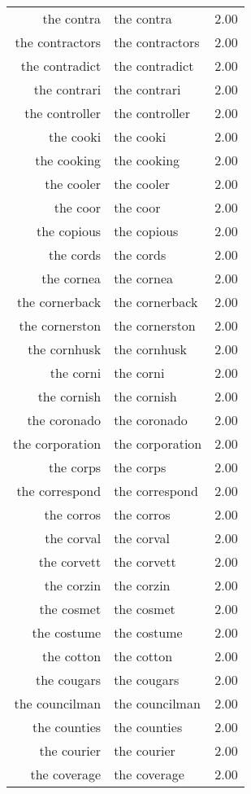 \begin{table}[ht]
\begin{tabular}{rlr}
  the contra & the contra & 2.00 \\ 
  the contractors & the contractors & 2.00 \\ 
  the contradict & the contradict & 2.00 \\ 
  the contrari & the contrari & 2.00 \\ 
  the controller & the controller & 2.00 \\ 
  the cooki & the cooki & 2.00 \\ 
  the cooking & the cooking & 2.00 \\ 
  the cooler & the cooler & 2.00 \\ 
  the coor & the coor & 2.00 \\ 
  the copious & the copious & 2.00 \\ 
  the cords & the cords & 2.00 \\ 
  the cornea & the cornea & 2.00 \\ 
  the cornerback & the cornerback & 2.00 \\ 
  the cornerston & the cornerston & 2.00 \\ 
  the cornhusk & the cornhusk & 2.00 \\ 
  the corni & the corni & 2.00 \\ 
  the cornish & the cornish & 2.00 \\ 
  the coronado & the coronado & 2.00 \\ 
  the corporation & the corporation & 2.00 \\ 
  the corps & the corps & 2.00 \\ 
  the correspond & the correspond & 2.00 \\ 
  the corros & the corros & 2.00 \\ 
  the corval & the corval & 2.00 \\ 
  the corvett & the corvett & 2.00 \\ 
  the corzin & the corzin & 2.00 \\ 
  the cosmet & the cosmet & 2.00 \\ 
  the costume & the costume & 2.00 \\ 
  the cotton & the cotton & 2.00 \\ 
  the cougars & the cougars & 2.00 \\ 
  the councilman & the councilman & 2.00 \\ 
  the counties & the counties & 2.00 \\ 
  the courier & the courier & 2.00 \\ 
  the coverage & the coverage & 2.00 \\ 

\end{tabular}
\end{table}

